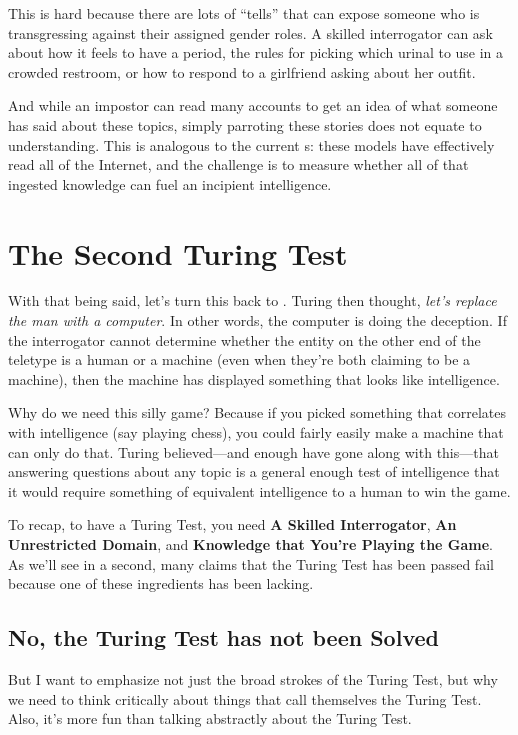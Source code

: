 This is hard because there are lots of ``tells'' that can expose
someone who is transgressing against their assigned gender roles.
%
A skilled interrogator can ask about how it feels to have a period,
the rules for picking which urinal to use in a crowded restroom, or
how to respond to a girlfriend asking about her outfit.

And while an impostor can read many accounts to get an idea of what
someone has said about these topics, simply parroting these stories does not
equate to understanding.
%
This is analogous to the current s: these models have effectively read
all of the
Internet, and the challenge is to measure whether all of that ingested
knowledge can fuel an incipient intelligence.

\section{The Second Turing Test}

With that being said, let's turn this back to .
%
Turing then thought,
\emph{let’s replace the man with a computer}.
%
In other words, the computer is doing the deception.
%
If the interrogator cannot determine whether the entity on the other end
of the teletype is a human or a machine (even when they're both claiming
to be a machine), then the machine has displayed something that looks like
intelligence.

Why do we need this silly game?
%
Because if you picked something that correlates with intelligence (say
playing chess), you could fairly easily make a machine that can only
do that.
%
Turing believed---and enough have gone along with this---that
answering questions about any topic is a general enough test of
intelligence that it would require something of equivalent
intelligence to a human to win the game.

To recap, to have a Turing Test, you need \textbf{A Skilled
  Interrogator}, \textbf{An Unrestricted Domain}, and \textbf{Knowledge
  that You're Playing the Game}.
%
As we'll see in a second, many claims that the Turing Test has been
passed fail because one of these ingredients has been lacking.


\subsection{No, the Turing Test has not been Solved}
\label{sec:turing:failures}


But I want to emphasize not just the broad strokes of the Turing Test,
but why we need to think critically about things that call themselves
the Turing Test.
%
Also, it’s more fun than talking abstractly about the Turing Test.

